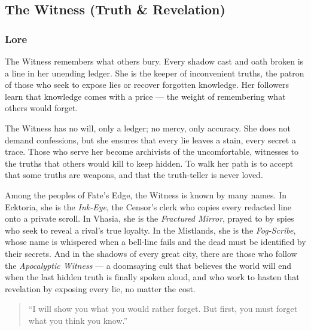 
\subsection{The Witness (Truth \& Revelation)}

\subsubsection*{Lore}
The Witness remembers what others bury. Every shadow cast and oath broken is a line in her unending ledger. She is the keeper of inconvenient truths, the patron of those who seek to expose lies or recover forgotten knowledge. Her followers learn that knowledge comes with a price --- the weight of remembering what others would forget.

The Witness has no will, only a ledger; no mercy, only accuracy. She does not demand confessions, but she ensures that every lie leaves a stain, every secret a trace. Those who serve her become archivists of the uncomfortable, witnesses to the truths that others would kill to keep hidden. To walk her path is to accept that some truths are weapons, and that the truth-teller is never loved.

Among the peoples of Fate's Edge, the Witness is known by many names. In Ecktoria, she is the \textit{Ink-Eye}, the Censor's clerk who copies every redacted line onto a private scroll. In Vhasia, she is the \textit{Fractured Mirror}, prayed to by spies who seek to reveal a rival's true loyalty. In the Mistlands, she is the \textit{Fog-Scribe}, whose name is whispered when a bell-line fails and the dead must be identified by their secrets. And in the shadows of every great city, there are those who follow the \textit{Apocalyptic Witness} --- a doomsaying cult that believes the world will end when the last hidden truth is finally spoken aloud, and who work to hasten that revelation by exposing every lie, no matter the cost.

\begin{quote}
``I will show you what you would rather forget. But first, you must forget what you think you know.''
\end{quote}

